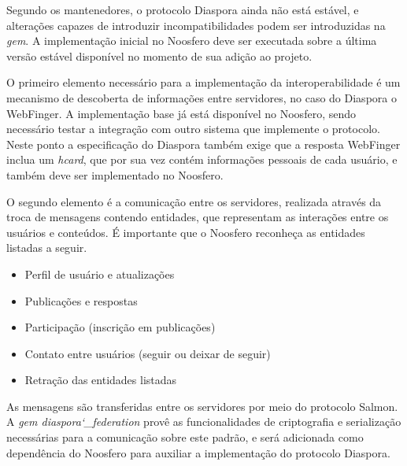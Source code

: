Segundo os mantenedores, o protocolo Diaspora ainda não está estável, e alterações
capazes de introduzir incompatibilidades podem ser introduzidas na \textit{gem}. A
implementação inicial no Noosfero deve ser executada sobre a última versão estável
disponível no momento de sua adição ao projeto.

O primeiro elemento necessário para a implementação da interoperabilidade é um
mecanismo de descoberta de informações entre servidores, no caso do Diaspora o
WebFinger. A implementação base já está disponível no Noosfero, sendo necessário
testar a integração com outro sistema que implemente o protocolo. Neste ponto a
especificação do Diaspora também exige que a resposta WebFinger inclua um
\textit{hcard}, que por sua vez contém informações pessoais de cada usuário, e
também deve ser implementado no Noosfero.

O segundo elemento é a comunicação entre os servidores, realizada através da troca
de mensagens contendo entidades, que representam as interações entre os usuários e
conteúdos. É importante que o Noosfero reconheça as entidades listadas a seguir.

\begin{itemize}
  \item{Perfil de usuário e atualizações}
  \item{Publicações e respostas}
  \item{Participação (inscrição em publicações)}
  \item{Contato entre usuários (seguir ou deixar de seguir)}
  \item{Retração das entidades listadas}
\end{itemize}

As mensagens são transferidas entre os servidores por meio do protocolo Salmon. A
\textit{gem diaspora\char`_federation} provê as funcionalidades de criptografia e
serialização necessárias para a comunicação sobre este padrão, e será adicionada
como dependência do Noosfero para auxiliar a implementação do protocolo Diaspora.

